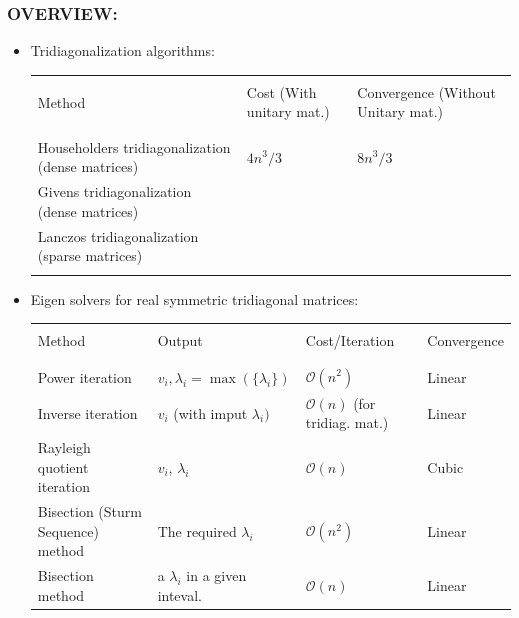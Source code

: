\documentclass[a4paper,8pt]{beamer} %
\begin{document}
\begin{frame} \frametitle{OVERVIEW:}%
		\begin{itemize}
			\item Tridiagonalization algorithms:
				\begin{table}
					\begin{Tiny}
						\centering
						\begin{tabular}{lll}
							\hline
							\hline
							\\
							Method & Cost (With unitary mat.) & Convergence (Without Unitary mat.) \\
							\\
							\hline
							\\
							Householders tridiagonalization (dense matrices) 	& $4n^3/3 $ & $ 8n^3/3 $ \\
							Givens tridiagonalization (dense matrices)			& %
							 &  \\
							Lanczos tridiagonalization (sparse matrices)		& & \\
							\\
							\hline
							\hline
						\end{tabular}
					\end{Tiny}
				\end{table}
			\item Eigen solvers for real symmetric tridiagonal matrices:
				\begin{table}
					\begin{Tiny}
						\centering
						\begin{tabular}{llll}
							\hline
							\hline
							\\
							Method & Output & Cost/Iteration & Convergence \\
							\\
							\hline
							\\
							Power iteration 			& $v_i, \lambda_{i}=\max{(\{\lambda_i\})}$ & $\mathcal O(n^{2})$& Linear\\ 
							Inverse iteration 			& $v_i$ (with imput $\lambda_{i})$ & $\mathcal O(n)$ (for tridiag. mat.) & Linear\\ 
							Rayleigh quotient iteration & $v_i$, $\lambda_{i}$ & $\mathcal O(n)$ &	Cubic \\
							Bisection (Sturm Sequence) method 	& The required $\lambda_i$ 	& $\mathcal O(n^2)$ & Linear \\
							Bisection method 		& a $\lambda_i$ in a given inteval.	& $\mathcal O(n)$ & Linear \\

\end{tabular}
\end{Tiny}
\end{table}
\end{itemize}
\end{frame}
\end{document}
